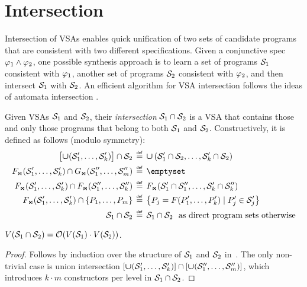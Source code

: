 \section{Intersection}
Intersection of VSAs enables quick unification of two sets of candidate programs that are consistent with two different specifications.
Given a conjunctive spec $\varphi_1 \wedge \varphi_2$, one possible synthesis approach is to learn a set of programs $\mathcal{S}_1$ consistent with
$\varphi_1$, another set of programs $\mathcal{S}_2$ consistent with $\varphi_2$, and then intersect $\mathcal{S}_1$ with $\mathcal{S}_2$.
An efficient algorithm for VSA intersection follows the ideas of automata intersection \cite{hopcroft1979introduction}.

\begin{defn}
    \label{def:intersection}
    Given VSAs $\mathcal{S}_1$ and $\mathcal{S}_2$, their \emph{intersection} $\mathcal{S}_1 \cap \mathcal{S}_2$ is a VSA that
    contains those and only those programs that belong to both $\mathcal{S}_1$ and $\mathcal{S}_2$.
    Constructively, it is defined as follows (modulo symmetry):
    \begin{align*}
        \bigl[\vsaunion(\vsa'_1, \dots, \vsa'_k)\bigr] \cap \vsa_2 &\bydef \vsaunion\,(\vsa'_1 \cap \vsa_2,
            \dots, \vsa'_k \cap \vsa_2) \\
        \joinCons(\vsa'_1, \dots, \vsa'_k) \cap \joinCons[G](\vsa''_1, \dots, \vsa''_m) &\bydef \emptyset \\
        \joinCons(\vsa'_1, \dots, \vsa'_k) \cap \joinCons(\vsa''_1, \dots, \vsa''_k) &\bydef
        \joinCons(\vsa'_1 \cap \vsa''_1, \dots, \vsa'_k \cap \vsa''_k) \\
        \joinCons(\vsa'_1, \dots, \vsa'_k) \cap \left\{P_1, \dots, P_m\right\} &\bydef
        \bigl\{P_j = F(P'_1, \dots, P'_k) \mid P'_j \in \vsa'_j\bigr\} \\
        \vsa_1 \cap \vsa_2 &\bydef \vsa_1 \cap \vsa_2\ \text{ as direct program sets otherwise}
    \end{align*}
\end{defn}

\begin{theorem}
    $V(\mathcal{S}_1 \cap \mathcal{S}_2) = \mathcal{O}(V(\mathcal{S}_1) \cdot V(\mathcal{S}_2))$.
\end{theorem}
\begin{proof}
    Follows by induction over the structure of $\mathcal{S}_1$ and $\mathcal{S}_2$ in~.
    The only non-trivial case is union intersection $[ \bm{\mathsf{\cup}}(\mathcal{S}'_1, \dots, \mathcal{S}'_k)] \cap [ \bm{\mathsf{\cup}}(\mathcal{S}''_1,
    \dots, \mathcal{S}''_m) ]$, which introduces $k \cdot m$ constructors per level in $\mathcal{S}_1 \cap \mathcal{S}_2$.
\end{proof}

